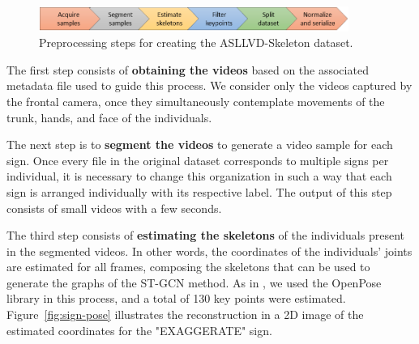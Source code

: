 \begin{figure}[ht!]
    \centering
    \includegraphics[width=0.9\textwidth]{images/dataset_preprocessing_en}
    \caption{Preprocessing steps for creating the ASLLVD-Skeleton dataset.}
    \label{fig:preprocessamento}
\end{figure}

\vspace{-4mm}

The first step consists of \textbf{obtaining the videos} based on the associated metadata file used to guide this process. We consider only the videos captured by the frontal camera, once they simultaneously contemplate movements of the trunk, hands, and face of the individuals.

The next step is to \textbf{segment the videos} to generate a video sample for each sign. Once every file in the original dataset corresponds to multiple signs per individual, it is necessary to change this organization in such a way that each sign is arranged individually with its respective label. %
The output of this step consists of small videos with a few seconds. %


The third step consists of \textbf{estimating the skeletons} of the individuals present in the segmented videos. In other words, the coordinates of the individuals' joints are estimated for all frames, composing the skeletons that can be used to generate the graphs of the ST-GCN method. As in \cite {st-gcn-2018}, we used the OpenPose library in this process, and a total of 130 key points were estimated. Figure~\ref{fig:sign-pose} illustrates the reconstruction in a 2D image of the estimated coordinates for the "EXAGGERATE" sign. \\[-8mm]

